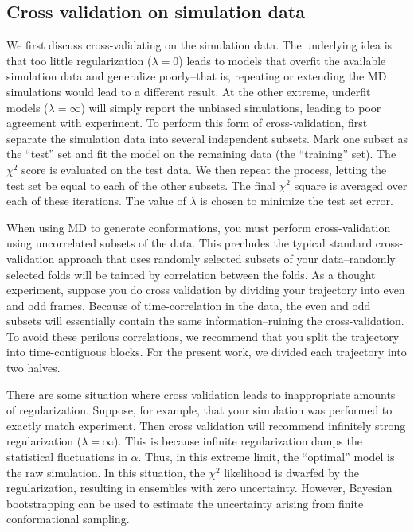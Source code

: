 \documentclass[journal=jacsat,manuscript=article]{achemso}
\begin{document}
\subsection{Cross validation on simulation data}

We first discuss cross-validating on the simulation data.  The underlying idea is that too little regularization ($\lambda = 0$) leads to models that overfit the available simulation data and generalize poorly--that is, repeating or extending the MD simulations would lead to a different result.  At the other extreme, underfit models ($\lambda = \infty$) will simply report the unbiased simulations, leading to poor agreement with experiment.  To perform this form of cross-validation, first separate the simulation data into several independent subsets.  Mark one subset as the ``test'' set and fit the model on the remaining data (the ``training'' set).  The $\chi^2$ score is evaluated on the test data.  We then repeat the process, letting the test set be equal to each of the other subsets.  The final $\chi^2$ square is averaged over each of these iterations.  The value of $\lambda$ is chosen to minimize the test set error.

When using MD to generate conformations, you must perform cross-validation using uncorrelated subsets of the data.  This precludes the typical standard cross-validation approach that uses randomly selected subsets of your data--randomly selected folds will be tainted by correlation between the folds.  As a thought experiment, suppose you do cross validation by dividing your trajectory into even and odd frames.  Because of time-correlation in the data, the even and odd subsets will essentially contain the same information--ruining the cross-validation.  To avoid these perilous correlations, we recommend that you split the trajectory into time-contiguous blocks.  For the present work, we divided each trajectory into two halves.  

There are some situation where cross validation leads to inappropriate amounts of regularization.  Suppose, for example, that your simulation was performed to exactly match experiment.  Then cross validation will recommend infinitely strong regularization ($\lambda = \infty$).  This is because infinite regularization damps the statistical fluctuations in $\alpha$.  Thus, in this extreme limit, the ``optimal'' model is the raw simulation.  In this situation, the $\chi^2$ likelihood is dwarfed by the regularization, resulting in ensembles with zero uncertainty.  However, Bayesian bootstrapping can be used to estimate the uncertainty arising from finite conformational sampling.  
\end{document}

